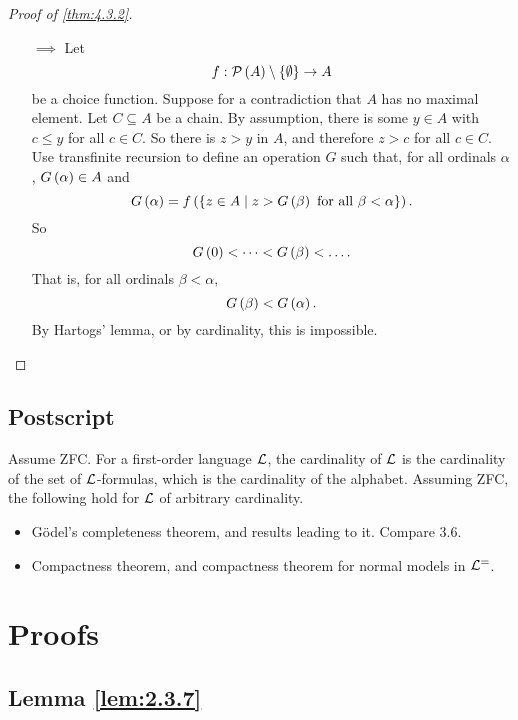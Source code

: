 \begin{proof}[Proof of \ref{thm:4.3.2}]
\hfill
\begin{itemize}
\item[$ \implies $] Let
$$ f : \mathcal{P} \left( A \right) \setminus \left\{ \emptyset \right\} \to A $$
be a choice function. Suppose for a contradiction that $ A $ has no maximal element. Let $ C \subseteq A $ be a chain. By assumption, there is some $ y \in A $ with $ c \le y $ for all $ c \in C $. So there is $ z > y $ in $ A $, and therefore $ z > c $ for all $ c \in C $. Use transfinite recursion to define an operation $ G $ such that, for all ordinals $ \alpha $, $ G\left( \alpha \right) \in A $ and
$$ G\left( \alpha \right) = f\left( \left\{ z \in A \mid z > G\left( \beta \right) \ \text{for all} \ \beta < \alpha \right\} \right). $$
So
$$ G\left( 0 \right) < \dots < G\left( \beta \right) < \dots. $$
That is, for all ordinals $ \beta < \alpha $,
$$ G\left( \beta \right) < G\left( \alpha \right). $$
By Hartogs' lemma, or by cardinality, this is impossible.
\end{itemize}
\end{proof}

\pagebreak

\subsection{Postscript}

Assume ZFC. For a first-order language $ \mathcal{L} $, the cardinality of $ \mathcal{L} $ is the cardinality of the set of $ \mathcal{L} $-formulas, which is the cardinality of the alphabet. Assuming ZFC, the following hold for $ \mathcal{L} $ of arbitrary cardinality.
\begin{itemize}
\item G\"odel's completeness theorem, and results leading to it. Compare 3.6.
\item Compactness theorem, and compactness theorem for normal models in $ \mathcal{L}^= $.
\end{itemize}

\pagebreak

\appendix

\section{Proofs}

\subsection{Lemma \ref{lem:2.3.7}}

